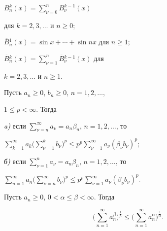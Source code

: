 $B_n^k(x)=\sum\limits_{\nu=0}^nB_{\nu}^{k-1}(x)$


для $k=2,3,\dotsc$ и $n\geq 0$;


$\overline{B}{}_n^1(x)=\sin x+\dotsb+\sin nx$ для $n\geq 1$;


$\overline{B}{}_n^k(x)=


\sum\limits_{\nu=1}^n\overline{B}{}_{\nu}^{k-1}(x)$ для


$k=2,3,\dotsc$ и $n\geq 1$.





\begin{lem}


Пусть $a_n\geq 0$, $b_n\geq 0$, $n=1,2,\dotsc$,


$1\leq p<\infty$. Тогда





{\em a)} если $\sum\limits_{\nu=n}^{\infty} a_{\nu}= 


a_n\beta_n$, $n=1,2,\dotsc$, то 


$\sum\limits_{k=1}^{\infty}a_k\Big(\sum\limits_{\nu=1}^{k}b_\nu\Big)^p \leq


p^p\sum\limits_{\nu=1}^{\infty} a_\nu(\beta_\nu b_\nu)^p;$





{\em б)} если $\sum\limits_{\nu=1}^{n} a_{\nu}= 


a_n\beta_n$, $n=1,2,\dotsc$, то


$\sum\limits_{n=1}^{\infty}a_n\Big(


\sum\limits_{\nu=n}^{\infty}b_\nu\Big)^p \leq


p^p\sum\limits_{\nu=1}^{\infty}a_\nu(\beta_\nu b_\nu)^p$. 


\end{lem}





\begin{lem}


Пусть $a_n\geq 0$, $0<\alpha\leq \beta<\infty$. Тогда


$$


\bigg(\sum\limits_{n=1}^{\infty}a_n^\beta\bigg)^{\frac1\beta}


\leq \bigg(\sum\limits_{n=1}^{\infty}a_n^\alpha\bigg)^{\frac1\alpha}.


$$


\end{lem}





